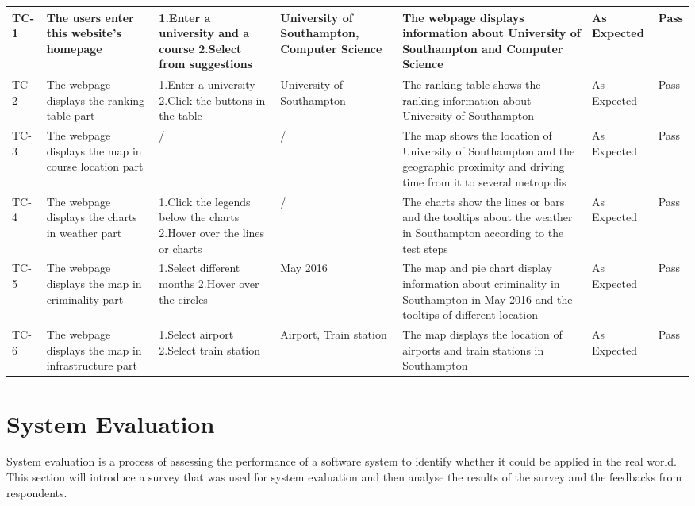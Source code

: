 \begin{landscape}
\begin{center}
\begin{longtable}{|p{1cm}|p{3.5cm}|p{4cm}|p{3cm}|p{5cm}|p{2.5cm}|p{1cm}|}
TC-1 & The users enter this website’s homepage & 1.Enter a university and a course \newline 2.Select from suggestions
 & University of Southampton, Computer Science & The webpage displays information about University of Southampton and Computer Science & As Expected & Pass \\ \hline
TC-2 &  The webpage displays the ranking table part & 1.Enter a university  \newline
2.Click the buttons in the table & University of Southampton & The ranking table shows the ranking information about University of Southampton & As Expected & Pass \\ \hline
TC-3 & The webpage displays the map in course location part & / & / & The map shows the location of University of Southampton and the geographic proximity and driving time from it to several metropolis & As Expected & Pass \\ \hline
TC-4 & The webpage displays the charts in weather part & 1.Click the legends below the charts  \newline
2.Hover over the lines or charts & / & The charts show the lines or bars and the tooltips about the weather in Southampton according to the test steps  & As Expected & Pass \\ \hline
TC-5 & The webpage displays the map in criminality part & 1.Select different months  \newline
2.Hover over the circles  & May 2016 & The map and pie chart display information about criminality in Southampton in May 2016 and the tooltips of different location & As Expected & Pass \\ \hline
TC-6 & The webpage displays the map in infrastructure part & 1.Select airport  \newline 2.Select train station
 & Airport, Train station & The map displays the location of airports and train stations in Southampton & As Expected & Pass \\ \hline



\end{longtable}
\end{center}
\end{landscape}

\section{System Evaluation}

System evaluation is a process of assessing the performance of a software system to identify whether it could be applied in the real world. This section will introduce a survey that was used for system evaluation and then analyse the results of the survey and the feedbacks from respondents.



